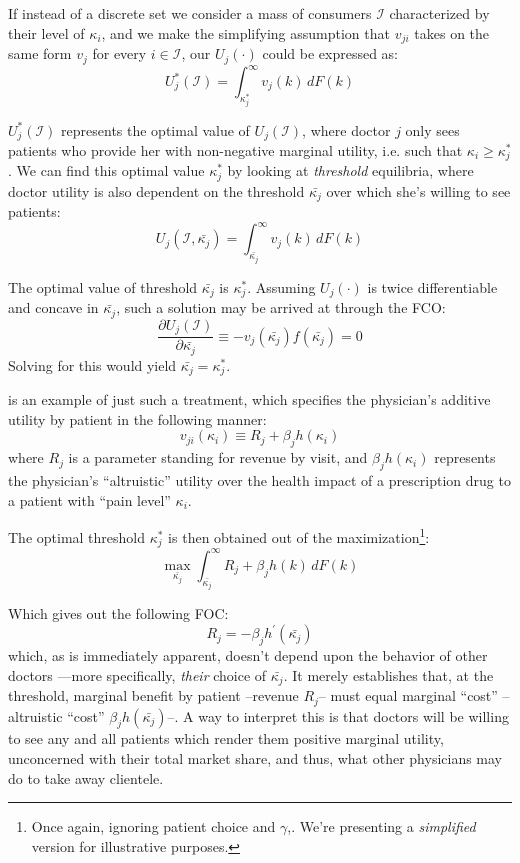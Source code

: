 \documentclass{article}
\begin{document}
If instead of a discrete set we consider a mass of consumers $\mathcal{I}$ characterized by their level of $\kappa_i$, and we make the simplifying assumption that $v_{ji}$ takes on the same form $v_{j}$ for every $i \in \mathcal{I}$, our $U_j(\cdot)$ could be expressed as:
\[
U_j^*(\mathcal{I}) =\int_{\kappa_j^*}^{\infty} v_{j}(k) \, dF(k)
\]

$U_j^*(\mathcal{I})$ represents the optimal value of $U_j(\mathcal{I})$, where doctor $j$ only sees patients who provide her with non-negative marginal utility, i.e. such that $\kappa_i \geq \kappa_j^*$. We can find this optimal value $\kappa_j^*$ by looking at \textit{threshold} equilibria, where doctor utility is also dependent on the threshold $\bar{\kappa_j}$ over which she’s willing to see patients:
\[
U_j(\mathcal{I}, \bar{\kappa_j}) =\int_{\bar{\kappa_j}}^{\infty} v_{j}(k) \, dF(k)
\]

The optimal value of threshold $\bar{\kappa_j}$ is $\kappa_j^*$. Assuming $U_j(\cdot) $ is twice differentiable and concave in $\bar{\kappa_j}$, such a solution may be arrived at through the FCO:
\[
\frac{\partial U_j(\mathcal{I})}{\partial \bar{\kappa_j}} \equiv - v_{j}(\bar{\kappa_j})f(\bar{\kappa_j}) = 0
\]
Solving for this would yield $\bar{\kappa_j} = \kappa_j^*$.

\cite{schnell2017physician} is an example of just such a treatment, which specifies the physician's additive utility by patient in the following manner:
\[
v_{ji}(\kappa_i) \equiv R_j + \beta_j h(\kappa_i)
\]
where $R_j$ is a parameter standing for revenue by visit, and $\beta_j h(\kappa_i)$ represents the physician's ``altruistic'' utility over the health impact of a prescription drug to a patient with ``pain level'' $\kappa_i$.

The optimal threshold $\kappa_j^*$ is then obtained out of the maximization\footnote{Once again, ignoring patient choice and $\gamma$,. We're presenting a \textit{simplified} version for illustrative purposes.}:
\[
\max_{\bar{\kappa_j}}\int_{\bar{\kappa_j}}^{\infty}  R_j + \beta_j h(k) \, dF(k)
\]

Which gives out the following FOC:
\[
R_j = - \beta_j h^{\prime}(\bar{\kappa_j})
\]
which, as is immediately apparent, doesn't depend upon the behavior of other doctors ---more specifically, \textit{their} choice of $\bar{\kappa_j}$. It merely establishes that, at the threshold, marginal benefit by patient --revenue $R_j$-- must equal marginal ``cost'' --altruistic ``cost'' $\beta_j h(\bar{\kappa_j})$--. A way to interpret this is that doctors will be willing to see any and all patients which render them positive marginal utility, unconcerned with their total market share, and thus, what other physicians may do to take away clientele.
\end{document}
